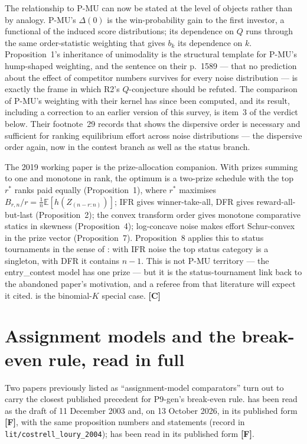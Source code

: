\documentclass[11pt,a4paper]{article}
\begin{document}
The relationship to P-MU can now be stated at the level of objects rather than
by analogy. P-MU's $\Delta(0)$ is the win-probability gain to the first
investor, a functional of the induced score distributions; its dependence on $Q$
runs through the same order-statistic weighting that gives $b_k$ its dependence
on $k$. Proposition~1's inheritance of unimodality is the structural template
for P-MU's hump-shaped weighting, and the sentence on their p.~1589 --- that no
prediction about the effect of competitor numbers survives for every noise
distribution --- is exactly the frame in which R2's $Q$-conjecture should be
refuted. The comparison of P-MU's weighting with their kernel has since been
computed, and its result, including a correction to an earlier version of this
survey, is item~3 of the verdict below. Their footnote~29
records that \citet{DrugovRyvkin2020a} shows the dispersive order is necessary
and sufficient for ranking equilibrium effort across noise distributions --- the
dispersive order again, now in the contest branch as well as the status branch.

The 2019 working paper is the prize-allocation companion. With prizes summing
to one and monotone in rank, the optimum is a two-prize schedule with the top
$r^*$ ranks paid equally (Proposition~1), where $r^*$ maximises $B_{r,n}/r =
\tfrac{1}{n}\mathbb{E}[h(Z_{(n-r:n)})]$; IFR gives winner-take-all, DFR gives
reward-all-but-last (Proposition~2); the convex transform order gives monotone
comparative statics in skewness (Proposition~4); log-concave noise makes
effort Schur-convex in the prize vector (Proposition~7). Proposition~8 applies
this to status tournaments in the sense of \citet{MoldovanuSelaShi2007}: with
IFR noise the top status category is a singleton, with DFR it contains $n-1$.
This is not P-MU territory --- the entry\_contest model has one prize --- but it
is the status-tournament link back to the abandoned paper's motivation, and a
referee from that literature will expect it cited. \citet{LimMatros2009} is the
binomial-$K$ special case. \textbf{[C]}

\section{Assignment models and the break-even rule, read in full}
\label{sec:assignment}

Two papers previously listed as ``assignment-model comparators'' turn out to
carry the closest published precedent for P9-gen's break-even rule.
\citet{CostrellLoury2004} has been read as the draft of 11 December 2003 and,
on 13 October 2026, in its published form \textbf{[F]}, with the same
proposition numbers and statements (record in \texttt{lit/costrell\_loury\_2004});
\citet{Suen2007} has been read in its published form \textbf{[F]}.
\end{document}
